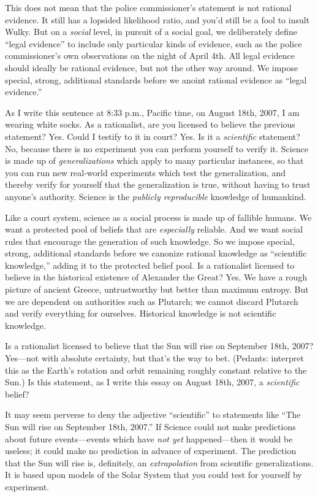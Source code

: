 {
 This does not mean that the police commissioner's
statement is not rational evidence. It still has a lopsided likelihood
ratio, and you'd still be a fool to insult Wulky. But
on a \textit{social} level, in pursuit of a social goal, we
deliberately define ``legal
evidence'' to include only particular kinds of
evidence, such as the police commissioner's own
observations on the night of April 4th. All legal evidence should
ideally be rational evidence, but not the other way around. We impose
special, strong, additional standards before we anoint rational
evidence as ``legal evidence.''}

{
 As I write this sentence at 8:33 p.m., Pacific time, on August
18th, 2007, I am wearing white socks. As a rationalist, are you
licensed to believe the previous statement? Yes. Could I testify to it
in court? Yes. Is it a \textit{scientific} statement? No, because there
is no experiment you can perform yourself to verify it. Science is made
up of \textit{generalizations} which apply to many particular
instances, so that you can run new real-world experiments which test
the generalization, and thereby verify for yourself that the
generalization is true, without having to trust
anyone's authority. Science is the \textit{publicly
reproducible} knowledge of humankind.}

{
 Like a court system, science as a social process is made up of
fallible humans. We want a protected pool of beliefs that are
\textit{especially} reliable. And we want social rules that encourage
the generation of such knowledge. So we impose special, strong,
additional standards before we canonize rational knowledge as
``scientific knowledge,'' adding it
to the protected belief pool. Is a rationalist licensed to believe in
the historical existence of Alexander the Great? Yes. We have a rough
picture of ancient Greece, untrustworthy but better than maximum
entropy. But we are dependent on authorities such as Plutarch; we
cannot discard Plutarch and verify everything for ourselves. Historical
knowledge is not scientific knowledge.}

{
 Is a rationalist licensed to believe that the Sun will rise on
September 18th, 2007? Yes---not with absolute certainty, but
that's the way to bet. (Pedants: interpret this as the
Earth's rotation and orbit remaining roughly constant
relative to the Sun.) Is this statement, as I write this essay on
August 18th, 2007, a \textit{scientific} belief?}

{
 It may seem perverse to deny the adjective
``scientific'' to statements like
``The Sun will rise on September 18th,
2007.'' If Science could not make predictions about
future events---events which have \textit{not yet} happened---then it
would be useless; it could make no prediction in advance of experiment.
The prediction that the Sun will rise is, definitely, an
\textit{extrapolation} from scientific generalizations. It is based
upon models of the Solar System that you could test for yourself by
experiment.}

